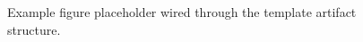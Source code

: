 \begin{figure}
    \centering
    \resizebox{0.75\linewidth}{!}{}
    \caption{Example figure placeholder wired through the template artifact structure.}
    \label{fig:example}
\end{figure}
